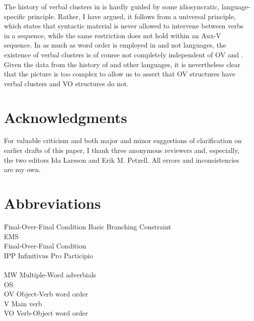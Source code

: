 \documentclass[output=paper, colorlinks, citecolor=brown]{langscibook}
\begin{document}
The history of verbal clusters in  is hardly guided by some idiosyncratic, language-specific principle. Rather, I have argued, it follows from a universal principle, which states that syntactic material is never allowed to intervene between verbs in a  sequence, while the same restriction does not hold within an Aux-V sequence. In as much as  word order is employed in  and not  languages, the existence of verbal clusters is of course not completely independent of OV and . Given the data from the history of  and other languages, it is nevertheless clear that the picture is too complex to allow us to assert that OV structures have verbal clusters and VO structures do not.


\section*{Acknowledgments}


For valuable criticism and both major and minor suggestions of clarification on earlier drafts of this paper, I thank three anonymous reviewers and, especially, the two editors Ida Larsson and Erik M. Petzell. All errors and inconsistencies are my own.


\section*{Abbreviations}
\begin{multicols}{2}
\begin{tabbing}
 \hspace{.5ex} \= Final-Over-Final Condition\kill
{}  \>   Basic Branching Constraint\\
EMS  \>   \\
 \>    Final-Over-Final Condition\\
IPP  \>   Infinitivus Pro Participio\\
  \>   \\
MW   \>  Multiple-Word adverbials\\
OS   \>  \\
OV   \>  Object-Verb word order\\
V    \> Main verb\\
VO   \>  Verb-Object word order
\end{tabbing}
\end{multicols}
\end{document}
